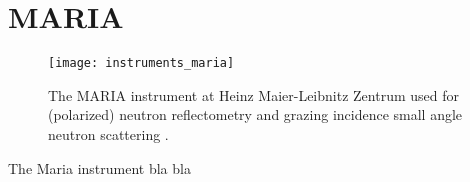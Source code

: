 \documentclass[\main/dresen_thesis.tex]{subfiles}
\begin{document}
\section{MARIA}\label{ch:appendix:lss:maria}
\begin{figure}[h]
  \centering
  \texttt{[image: instruments\_maria]}
  \caption{\label{fig:appendix:lss:maria}The MARIA instrument at Heinz Maier-Leibnitz Zentrum used for (polarized) neutron reflectometry and grazing incidence small angle neutron scattering \cite{Heinz_2015_Maria}.}
\end{figure}
The Maria instrument bla bla
\end{document}
